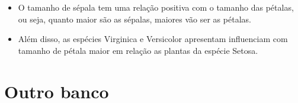 \documentclass[
]{book}
\providecommand{\tightlist}{%
  \setlength{\itemsep}{0pt}\setlength{\parskip}{0pt}}
\begin{document}
\begin{itemize}
\tightlist
\item
  O tamanho de sépala tem uma relação positiva com o tamanho das pétalas, ou seja, quanto maior são as sépalas, maiores vão ser as pétalas.
\item
  Além disso, as espécies Virginica e Versicolor apresentam influenciam com tamanho de pétala maior em relação as plantas da espécie Setosa.
\end{itemize}

\hypertarget{outro-banco}{%
\section{Outro banco}\label{outro-banco}}

  
\end{document}
